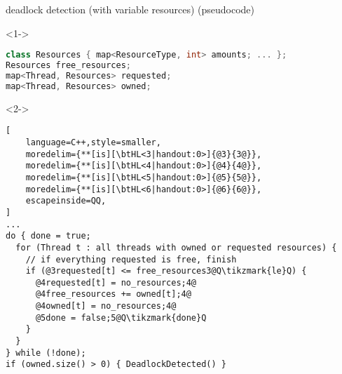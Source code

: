 \begin{frame}[fragile,label=deadlockDetectMulti]{deadlock detection (with variable resources)}
\vspace{-.5cm}
{\small (pseudocode)}
\begin{onlyenv}<1->
\begin{lstlisting}[language=C++,style=smaller]
class Resources { map<ResourceType, int> amounts; ... };
Resources free_resources;
map<Thread, Resources> requested;
map<Thread, Resources> owned;
\end{lstlisting}
\end{onlyenv}
\begin{onlyenv}<2->
\begin{lstlisting}[
    language=C++,style=smaller,
    moredelim={**[is][\btHL<3|handout:0>]{@3}{3@}},
    moredelim={**[is][\btHL<4|handout:0>]{@4}{4@}},
    moredelim={**[is][\btHL<5|handout:0>]{@5}{5@}},
    moredelim={**[is][\btHL<6|handout:0>]{@6}{6@}},
    escapeinside=QQ,
]
...
do { done = true;
  for (Thread t : all threads with owned or requested resources) {
    // if everything requested is free, finish
    if (@3requested[t] <= free_resources3@Q\tikzmark{le}Q) {
      @4requested[t] = no_resources;4@
      @4free_resources += owned[t];4@
      @4owned[t] = no_resources;4@
      @5done = false;5@Q\tikzmark{done}Q
    }
  }
} while (!done);
if (owned.size() > 0) { DeadlockDetected() }
\end{lstlisting}
\end{onlyenv}
\end{frame}
